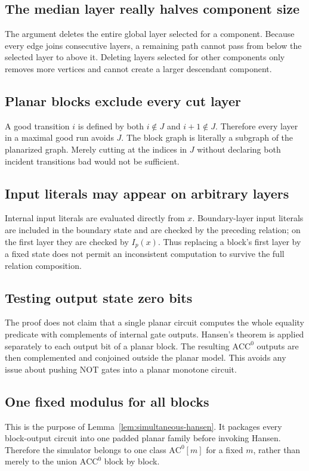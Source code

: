 \documentclass[11pt]{article}
\theoremstyle{definition}
\newcommand{\ACC}{\mathrm{ACC}^{0}}
\newcommand{\ACm}[1]{\mathrm{AC}^{0}[#1]}
\begin{document}
\subsection{The median layer really halves component size}
The argument deletes the entire global layer selected for a component. Because every edge joins consecutive layers, a remaining path cannot pass from below the selected layer to above it. Deleting layers selected for other components only removes more vertices and cannot create a larger descendant component.

\subsection{Planar blocks exclude every cut layer}
A good transition $i$ is defined by both $i\notin J$ and $i+1\notin J$. Therefore every layer in a maximal good run avoids $J$. The block graph is literally a subgraph of the planarized graph. Merely cutting at the indices in $J$ without declaring both incident transitions bad would not be sufficient.

\subsection{Input literals may appear on arbitrary layers}
Internal input literals are evaluated directly from $x$. Boundary-layer input literals are included in the boundary state and are checked by the preceding relation; on the first layer they are checked by $I_p(x)$. Thus replacing a block's first layer by a fixed state does not permit an inconsistent computation to survive the full relation composition.

\subsection{Testing output state zero bits}
The proof does not claim that a single planar circuit computes the whole equality predicate with complements of internal gate outputs. Hansen's theorem is applied separately to each output bit of a planar block. The resulting $\ACC$ outputs are then complemented and conjoined outside the planar model. This avoids any issue about pushing NOT gates into a planar monotone circuit.

\subsection{One fixed modulus for all blocks}
This is the purpose of Lemma~\ref{lem:simultaneous-hansen}. It packages every block-output circuit into one padded planar family before invoking Hansen. Therefore the simulator belongs to one class $\ACm{m}$ for a fixed $m$, rather than merely to the union $\ACC$ block by block.
\end{document}
